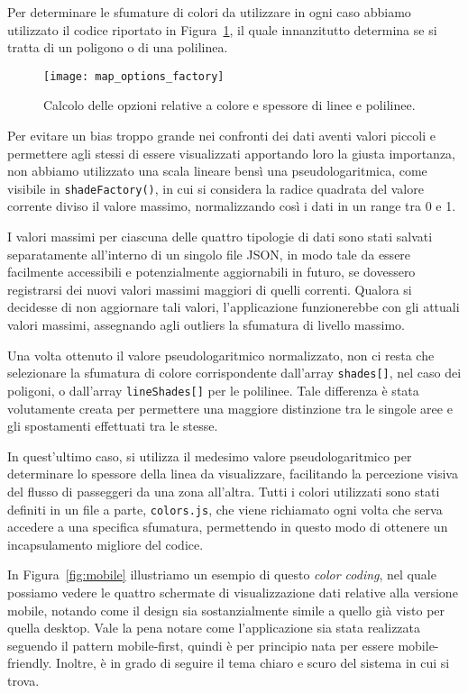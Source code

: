 Per determinare le sfumature di colori da utilizzare in ogni caso abbiamo utilizzato il codice riportato in Figura~\ref{fig:map_options_factory}, il quale innanzitutto determina se si tratta di un poligono o di una polilinea.

\begin{figure}[H]
    \centering
    \texttt{[image: map\_options\_factory]}
    \caption[Calcolo delle opzioni su colore e spessore]{Calcolo delle opzioni relative a colore e spessore di linee e polilinee.}
    \label{fig:map_options_factory}
\end{figure}

Per evitare un bias troppo grande nei confronti dei dati aventi valori piccoli e permettere agli stessi di essere visualizzati apportando loro la giusta importanza, non abbiamo utilizzato una scala lineare bensì una pseudologaritmica, come visibile in \Verb_shadeFactory()_, in cui si considera la radice quadrata del valore corrente diviso il valore massimo, normalizzando così i dati in un range tra 0 e 1.

I valori massimi per ciascuna delle quattro tipologie di dati sono stati salvati separatamente all'interno di un singolo file JSON, in modo tale da essere facilmente accessibili e potenzialmente aggiornabili in futuro, se dovessero registrarsi dei nuovi valori massimi maggiori di quelli correnti. Qualora si decidesse di non aggiornare tali valori, l'applicazione funzionerebbe con gli attuali valori massimi, assegnando agli outliers la sfumatura di livello massimo.

Una volta ottenuto il valore pseudologaritmico normalizzato, non ci resta che selezionare la sfumatura di colore corrispondente dall'array \Verb_shades[]_, nel caso dei poligoni, o dall'array \Verb_lineShades[]_ per le polilinee. Tale differenza è stata volutamente creata per permettere una maggiore distinzione tra le singole aree e gli spostamenti effettuati tra le stesse.

In quest'ultimo caso, si utilizza il medesimo valore pseudologaritmico per determinare lo spessore della linea da visualizzare, facilitando la percezione visiva del flusso di passeggeri da una zona all'altra. Tutti i colori utilizzati sono stati definiti in un file a parte, \Verb_colors.js_, che viene richiamato ogni volta che serva accedere a una specifica sfumatura, permettendo in questo modo di ottenere un incapsulamento migliore del codice.

In Figura~\ref{fig:mobile} illustriamo un esempio di questo \textit{color coding}, nel quale possiamo vedere le quattro schermate di visualizzazione dati relative alla versione mobile, notando come il design sia sostanzialmente simile a quello già visto per quella desktop.
Vale la pena notare come l'applicazione sia stata realizzata seguendo il pattern mobile-first, quindi è per principio nata per essere mobile-friendly. Inoltre, è in grado di seguire il tema chiaro e scuro del sistema in cui si trova.

